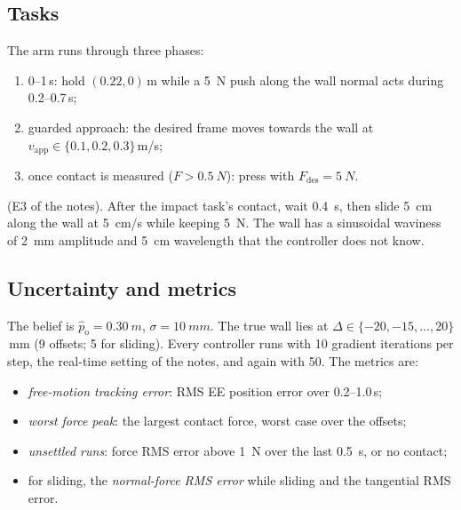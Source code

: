 \documentclass[11pt,a4paper]{article}
\newcommand{\phat}{\hat{p}_{\mathrm{o}}}
\newcommand{\Fdes}{F_{\mathrm{des}}}
\newcommand{\vapp}{v_{\mathrm{app}}}
\begin{document}
\subsection{Tasks}
\begin{description}[leftmargin=10pt,font=\normalfont\bfseries]
\item[Impact task.] The arm runs through three phases:
  \begin{enumerate}[leftmargin=14pt]
  \item 0--1\,s: hold $(0.22,0)$\,m while a \SI{5}{N} push along the wall normal acts during 0.2--0.7\,s;
  \item guarded approach: the desired frame moves towards the wall at $\vapp\in\{0.1,0.2,0.3\}$\,m/s;
  \item once contact is measured ($F>\SI{0.5}{N}$): press with $\Fdes=\SI{5}{N}$.
  \end{enumerate}
\item[Sliding task] (E3 of the notes). After the impact task's contact, wait \SI{0.4}{s}, then slide
  \SI{5}{cm} along the wall at \SI{5}{cm/s} while keeping \SI{5}{N}. The wall has a sinusoidal waviness of
  \SI{2}{mm} amplitude and \SI{5}{cm} wavelength that the controller does not know.
\end{description}

\subsection{Uncertainty and metrics}
The belief is $\phat=\SI{0.30}{m}$, $\sigma=\SI{10}{mm}$. The true wall lies at
$\Delta\in\{-20,-15,\dots,20\}$\,mm (9 offsets; 5 for sliding). Every controller runs with 10 gradient
iterations per step, the real-time setting of the notes, and again with 50. The metrics are:
\begin{itemize}[leftmargin=14pt]
\item \emph{free-motion tracking error}: RMS EE position error over 0.2--1.0\,s;
\item \emph{worst force peak}: the largest contact force, worst case over the offsets;
\item \emph{unsettled runs}: force RMS error above \SI{1}{N} over the last \SI{0.5}{s}, or no contact;
\item for sliding, the \emph{normal-force RMS error} while sliding and the tangential RMS error.
\end{itemize}
\end{document}
